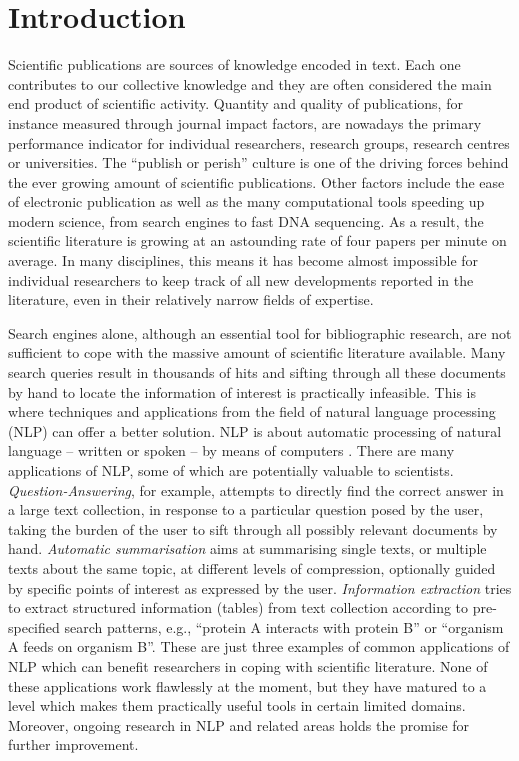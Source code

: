 
\chapter{Introduction}

Scientific publications are sources of knowledge encoded in text.
Each one contributes to our collective knowledge and they are often considered the main end product of scientific activity.
Quantity and quality of publications, for instance measured through journal impact factors, are nowadays the primary performance indicator for individual researchers, research groups, research centres or universities.  
The ``publish or perish'' culture is one of the driving forces behind the ever growing amount of scientific publications.
Other factors include the ease of electronic publication as well as the many computational tools speeding up modern science, from search engines to fast DNA sequencing.
As a result, the scientific literature is growing at an astounding rate of four papers per minute on average.
In many disciplines, this means it has become almost impossible for individual researchers to keep track of all new developments reported in the literature, even in their relatively narrow fields of expertise.

Search engines alone, although an essential tool for bibliographic research, are not sufficient to cope with the massive amount of scientific literature available.
Many search queries result in thousands of hits and sifting through all these documents by hand to locate the information of interest is practically infeasible.
This is where techniques and applications from the field of natural language processing (NLP) can offer a better solution.
NLP is about automatic processing of natural language -- written or spoken -- by means of computers \citep{jurafsky2000speech,manning1999foundations}.
There are many applications of NLP, some of which are potentially valuable to scientists.   
\emph{Question-Answering}, for example, attempts to directly find the correct answer in a large text collection, in response to a particular question posed by the user, taking the burden of the user to sift through all possibly relevant documents by hand.
\emph{Automatic summarisation} aims at summarising single texts, or multiple texts about the same topic, at different levels of compression, optionally guided by specific points of interest as expressed by the user.
\emph{Information extraction} tries to extract structured information (tables) from text collection according to pre-specified search patterns, e.g., ``protein A interacts with protein B'' or ``organism A feeds on organism B''.
These are just three examples of common applications of NLP which can benefit researchers in coping with scientific literature.
None of these applications work flawlessly at the moment, but they have matured to a level which makes them practically useful tools in certain limited domains.
Moreover, ongoing research in NLP and related areas holds the promise for further improvement.
  

